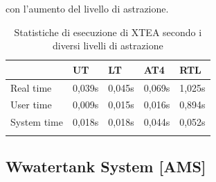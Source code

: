 \documentclass[]{IEEEtran}
\begin{document}
con l'aumento del livello di astrazione.
\begin{table}[]
    \centering
    \begin{tabular}{lllll}
    \toprule
                & UT     & LT     & AT4    & RTL    \\ \hline
    Real time   & 0,039s & 0,045s & 0,069s & 1,025s \\
    User time   & 0,009s & 0,015s & 0,016s & 0,894s \\
    System time & 0,018s & 0,018s & 0,044s & 0,052s \\ \bottomrule
    \\
    \end{tabular}
    \caption{Statistiche di esecuzione di XTEA secondo i diversi livelli di astrazione}
    \label{tab:time}
\end{table}

\subsection{Wwatertank System [AMS]}\label{sec:continuous}
\end{document}
